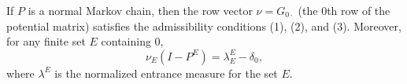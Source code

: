 If $P$ is a normal Markov chain, then the row vector $\nu = G_{0\cdot}$ (the $0$th row of the potential matrix) satisfies the admissibility conditions (1), (2), and (3). Moreover, for any finite set $E$ containing $0$,
$$\nu_E (I - P^E) = \lambda^E_E - \delta_0,$$
where $\lambda^E$ is the normalized entrance measure for the set $E$.
